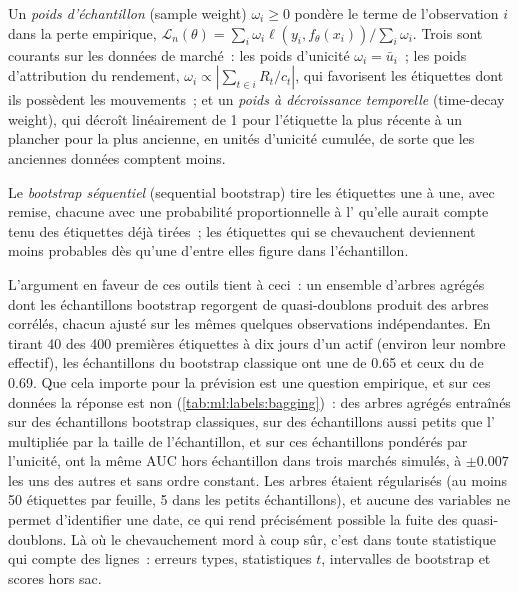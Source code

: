 \begin{definition}\label{def:ml:targets-labels-and-sample-weights:weights}
Un \emph{poids d'échantillon} (sample weight) $\omega_i\ge0$ pondère le terme de l'observation $i$ dans la perte empirique,
$\mathcal L_n(\theta) = \sum_i\omega_i\ell(y_i, f_\theta(x_i))/\sum_i\omega_i$. Trois sont courants sur les données de marché~:
les poids d'unicité $\omega_i = \bar u_i$~; les poids d'attribution du rendement, $\omega_i\propto|\sum_{t\in i}R_t/c_t|$, qui
favorisent les étiquettes dont ils possèdent les mouvements~; et un \emph{poids à décroissance temporelle} (time-decay weight), qui décroît linéairement de 1
pour l'étiquette la plus récente à un plancher pour la plus ancienne, en unités d'unicité cumulée, de sorte que les anciennes données comptent moins.
\end{definition}

\begin{definition}\label{def:ml:targets-labels-and-sample-weights:seqboot}
Le \emph{bootstrap séquentiel} (sequential bootstrap) tire les étiquettes une à une, avec remise, chacune avec
une probabilité proportionnelle à l' qu'elle aurait compte tenu des étiquettes déjà tirées~; les étiquettes qui se chevauchent
deviennent moins probables dès qu'une d'entre elles figure dans l'échantillon.
\end{definition}

L'argument en faveur de ces outils tient à ceci~: un ensemble d'arbres agrégés dont les échantillons bootstrap regorgent de quasi-doublons produit des arbres corrélés,
chacun ajusté sur les mêmes quelques observations indépendantes. En tirant 40 des 400 premières étiquettes à dix jours d'un actif
(environ leur nombre effectif), les échantillons du bootstrap classique ont une  de 0.65 et ceux du 
de 0.69. Que cela importe pour la prévision est une question empirique, et sur ces données la réponse est non
(\cref{tab:ml:labels:bagging})~: des arbres agrégés entraînés sur des échantillons bootstrap classiques, sur des échantillons aussi petits que
l' multipliée par la taille de l'échantillon, et sur ces échantillons pondérés par l'unicité, ont la même AUC hors échantillon dans trois
marchés simulés, à $\pm0.007$ les uns des autres et sans ordre constant. Les arbres étaient régularisés (au moins 50
étiquettes par feuille, 5 dans les petits échantillons), et aucune des variables ne permet d'identifier une date, ce qui rend
précisément possible la fuite des quasi-doublons. Là où le chevauchement mord à coup sûr, c'est dans toute statistique qui compte des lignes~:
erreurs types, statistiques $t$, intervalles de bootstrap et scores hors sac.

